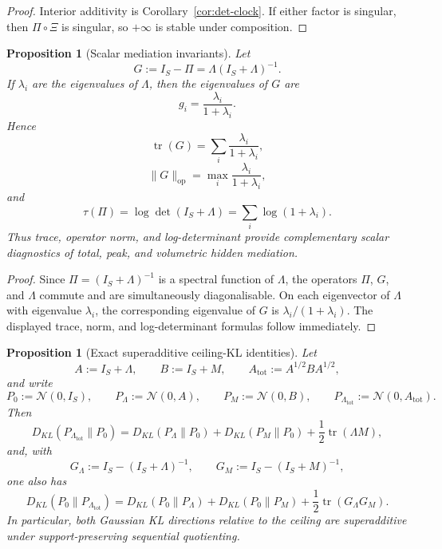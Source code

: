 \documentclass[11pt]{article}
\numberwithin{equation}{section}
\theoremstyle{thmcompact}
\newtheorem{proposition}[theorem]{Proposition}
\theoremstyle{remark}
\begin{document}
\begin{proof}
Interior additivity is Corollary~\ref{cor:det-clock}. If either factor is singular, then $\Pi\circ\Xi$ is singular, so $+\infty$ is stable under composition.
\end{proof}

\begin{proposition}[Scalar mediation invariants]\label{prop:scalar-mediation}
Let
\[
G:=I_S-\Pi=\Lambda(I_S+\Lambda)^{-1}.
\]
If $\lambda_i$ are the eigenvalues of $\Lambda$, then the eigenvalues of $G$ are
\[
g_i=\frac{\lambda_i}{1+\lambda_i}.
\]
Hence
\begin{equation}\label{eq:trace-gap-load}
\operatorname{tr}(G)=\sum_i \frac{\lambda_i}{1+\lambda_i},
\end{equation}
\begin{equation}\label{eq:op-gap-load}
\|G\|_{\mathrm{op}}=\max_i \frac{\lambda_i}{1+\lambda_i},
\end{equation}
and
\begin{equation}\label{eq:logdet-gap-load}
\tau(\Pi)=\log\det(I_S+\Lambda)=\sum_i \log(1+\lambda_i).
\end{equation}
Thus trace, operator norm, and log-determinant provide complementary scalar diagnostics of total, peak, and volumetric hidden mediation.
\end{proposition}

\begin{proof}
Since $\Pi=(I_S+\Lambda)^{-1}$ is a spectral function of $\Lambda$, the operators $\Pi$, $G$, and $\Lambda$ commute and are simultaneously diagonalisable. On each eigenvector of $\Lambda$ with eigenvalue $\lambda_i$, the corresponding eigenvalue of $G$ is $\lambda_i/(1+\lambda_i)$. The displayed trace, norm, and log-determinant formulas follow immediately.
\end{proof}

\begin{proposition}[Exact superadditive ceiling-KL identities]\label{prop:ceiling-kl-superadditive}
Let
\[
A:=I_S+\Lambda,
\qquad
B:=I_S+M,
\qquad
A_{\mathrm{tot}}:=A^{1/2}BA^{1/2},
\]
and write
\[
P_0:=\mathcal N(0,I_S),
\qquad
P_\Lambda:=\mathcal N(0,A),
\qquad
P_M:=\mathcal N(0,B),
\qquad
P_{\Lambda_{\mathrm{tot}}}:=\mathcal N(0,A_{\mathrm{tot}}).
\]
Then
\begin{equation}\label{eq:reverse-kl-superadditive}
D_{KL}(P_{\Lambda_{\mathrm{tot}}}\|P_0)
=
D_{KL}(P_\Lambda\|P_0)+D_{KL}(P_M\|P_0)+\frac12\operatorname{tr}(\Lambda M),
\end{equation}
and, with
\[
G_\Lambda:=I_S-(I_S+\Lambda)^{-1},
\qquad
G_M:=I_S-(I_S+M)^{-1},
\]
one also has
\begin{equation}\label{eq:forward-kl-superadditive}
D_{KL}(P_0\|P_{\Lambda_{\mathrm{tot}}})
=
D_{KL}(P_0\|P_\Lambda)+D_{KL}(P_0\|P_M)+\frac12\operatorname{tr}(G_\Lambda G_M).
\end{equation}
In particular, both Gaussian KL directions relative to the ceiling are superadditive under support-preserving sequential quotienting.
\end{proposition}
\end{document}

